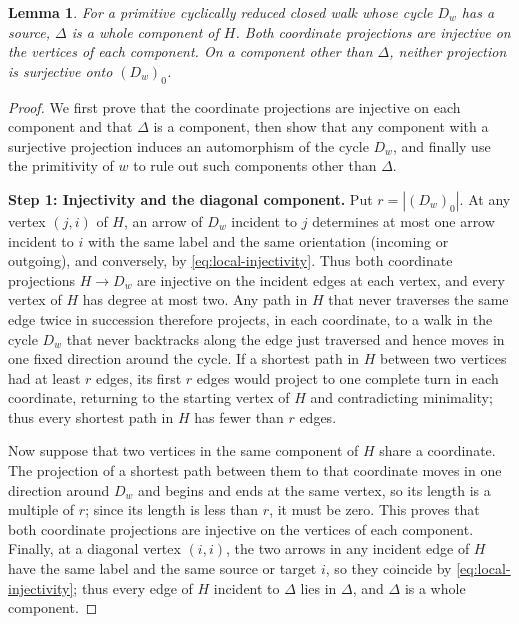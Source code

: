 \documentclass[a4paper,reqno,10pt]{amsart}
\newtheorem{lemma}[theorem]{Lemma}
\theoremstyle{definition}
\numberwithin{equation}{section}
\begin{document}
\begin{lemma}\label{lem:matching-components}
For a primitive cyclically reduced closed walk whose cycle $D_w$ has
a source, $\Delta$ is a whole component of $H$. Both coordinate
projections are injective on the vertices of each component. On a component
other than $\Delta$, neither projection is surjective onto $(D_w)_0$.
\end{lemma}
\begin{proof}
We first prove that the coordinate projections are injective on each component and that $\Delta$ is a component, then show that any component
with a surjective projection induces an automorphism of the cycle $D_w$, and
finally use the primitivity of $w$ to rule out such components other than $\Delta$.

\noindent\textbf{Step 1: Injectivity and the diagonal component.}
Put $r=|(D_w)_0|$. At any vertex $(j,i)$ of $H$, an arrow of $D_w$ incident to $j$
determines at most one arrow incident to $i$ with the same label and the same
orientation (incoming or outgoing), and conversely, by
\eqref{eq:local-injectivity}. Thus both coordinate projections $H\to D_w$ are
injective on the incident edges at each vertex, and every vertex of $H$ has degree at most two. Any path in $H$
that never traverses the same edge twice in succession therefore projects, in each coordinate, to a walk in the cycle $D_w$ that never
backtracks along the edge just traversed and hence moves in one fixed
direction around the cycle. If a shortest path in $H$ between two vertices had at least $r$
edges, its first $r$ edges would project to one complete turn in each
coordinate, returning to the starting vertex of $H$ and contradicting minimality; thus every shortest path in $H$ has fewer than $r$ edges.

Now suppose that two vertices in the same component of $H$ share a coordinate. The projection of a shortest path between them to that coordinate moves in one direction around $D_w$ and begins and ends at the same vertex, so its length is a multiple of $r$; since its length is less than $r$, it must be zero. This proves that both coordinate projections are injective on the vertices of each component.
Finally, at a diagonal vertex $(i,i)$, the two arrows in any incident edge of $H$
have the same label and the same source or target $i$, so they coincide by \eqref{eq:local-injectivity}; thus every edge of $H$ incident to $\Delta$ lies in $\Delta$, and $\Delta$ is a whole component.


\end{proof}
\end{document}
